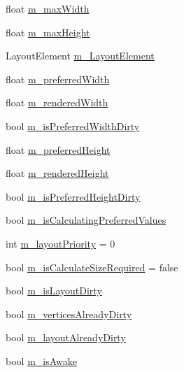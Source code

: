 \begin{DoxyCompactItemize}
\item 
float \mbox{\hyperlink{class_t_m_pro_1_1_t_m_p___text_a7b58030e799ccdb29eee1f8bfc669d8c}{m\+\_\+max\+Width}}
\item 
float \mbox{\hyperlink{class_t_m_pro_1_1_t_m_p___text_a2cbddaa60926629760f5bdefd333f4bf}{m\+\_\+max\+Height}}
\item 
Layout\+Element \mbox{\hyperlink{class_t_m_pro_1_1_t_m_p___text_a41aa446544d254a7b8e0e994eeceda12}{m\+\_\+\+Layout\+Element}}
\item 
float \mbox{\hyperlink{class_t_m_pro_1_1_t_m_p___text_a9d5996539c5d738f644e8c1d5a6d2a29}{m\+\_\+preferred\+Width}}
\item 
float \mbox{\hyperlink{class_t_m_pro_1_1_t_m_p___text_ab71250a9179056a1992e026dd58ace09}{m\+\_\+rendered\+Width}}
\item 
bool \mbox{\hyperlink{class_t_m_pro_1_1_t_m_p___text_a5de2e7e9c7fda6a8f2a20475972f0c96}{m\+\_\+is\+Preferred\+Width\+Dirty}}
\item 
float \mbox{\hyperlink{class_t_m_pro_1_1_t_m_p___text_af7be913af2aa77abff8eb9e8220e9d87}{m\+\_\+preferred\+Height}}
\item 
float \mbox{\hyperlink{class_t_m_pro_1_1_t_m_p___text_a6ef5d9eaa22101dc2b35a5b2f90ca2bf}{m\+\_\+rendered\+Height}}
\item 
bool \mbox{\hyperlink{class_t_m_pro_1_1_t_m_p___text_a826189672621eb31d60b0c36f2724eff}{m\+\_\+is\+Preferred\+Height\+Dirty}}
\item 
bool \mbox{\hyperlink{class_t_m_pro_1_1_t_m_p___text_ae2058b0467333884af256dc3d94e9c67}{m\+\_\+is\+Calculating\+Preferred\+Values}}
\item 
int \mbox{\hyperlink{class_t_m_pro_1_1_t_m_p___text_aa421d82a7919044cc3a060d4bdd44c14}{m\+\_\+layout\+Priority}} = 0
\item 
bool \mbox{\hyperlink{class_t_m_pro_1_1_t_m_p___text_ae90296d68da52e9317355e448fda9bd4}{m\+\_\+is\+Calculate\+Size\+Required}} = false
\item 
bool \mbox{\hyperlink{class_t_m_pro_1_1_t_m_p___text_a9ba93d2b7bcd757b218d9055713b7b83}{m\+\_\+is\+Layout\+Dirty}}
\item 
bool \mbox{\hyperlink{class_t_m_pro_1_1_t_m_p___text_a80828e6a0264d6edb7b1299702d7f599}{m\+\_\+vertices\+Already\+Dirty}}
\item 
bool \mbox{\hyperlink{class_t_m_pro_1_1_t_m_p___text_a3ec194382ce409e28b690796bc45b028}{m\+\_\+layout\+Already\+Dirty}}
\item 
bool \mbox{\hyperlink{class_t_m_pro_1_1_t_m_p___text_a67cf7cc3a41d8726bcf065f91d57222c}{m\+\_\+is\+Awake}}

\end{DoxyCompactItemize}
